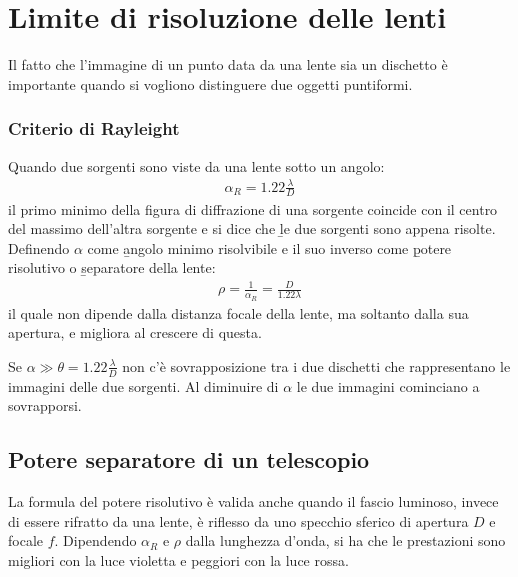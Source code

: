 \section{Limite di risoluzione delle lenti}%
Il fatto che l'immagine di un punto data da una lente sia un dischetto è importante quando si vogliono distinguere due oggetti puntiformi.

\subsubsection{Criterio di Rayleight}
Quando due sorgenti sono viste da una lente sotto un angolo:
\begin{equation}\begin{split}
\alpha_R=1.22\frac{\lambda}{D}
\end{split}\end{equation}
il primo minimo della figura di diffrazione di una sorgente coincide con il centro del massimo dell'altra sorgente e si dice che \b{le due sorgenti sono appena risolte}. Definendo $\alpha$ come \b{angolo minimo risolvibile} e il suo inverso come \b{potere risolutivo} o \b{separatore della lente}:
\begin{equation}\begin{split}
\rho=\frac{1}{\alpha_R}=\frac{D}{1.22\lambda}
\end{split}\end{equation}
il quale non dipende dalla distanza focale della lente, ma soltanto dalla sua apertura, e migliora al crescere di questa.

Se $\alpha\gg\theta=1.22\frac{\lambda}{D}$ non c'è sovrapposizione tra i due dischetti che rappresentano le immagini delle due sorgenti. Al diminuire di $\alpha$ le due immagini cominciano a sovrapporsi.

\subsection{Potere separatore di un telescopio}
La formula del potere risolutivo è valida anche quando il fascio luminoso, invece di essere rifratto da una lente, è riflesso da uno specchio sferico di apertura $D$ e focale $f$. Dipendendo $\alpha_R$ e $\rho$ dalla lunghezza d'onda, si ha che le prestazioni sono migliori con la luce violetta e peggiori con la luce rossa.

